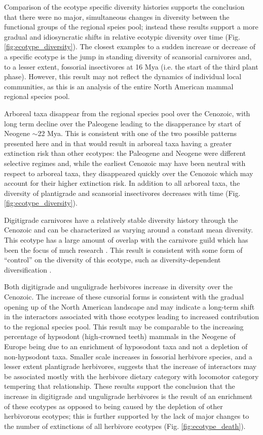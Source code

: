 \documentclass[12pt,letterpaper]{article}
\begin{document}
Comparison of the ecotype specific diversity histories supports the conclusion that there were no major, simultaneous changes in diversity between the functional groups of the regional speies pool; instead these results support a more gradual and idiosyncratic shifts in relative ecotypic diversity over time (Fig. \ref{fig:ecotype_diversity}). The closest examples to a sudden increase or decrease of a specific ecotype is the jump in standing diversity of scansorial carnivores and, to a lesser extent, fossorial insectivores at 16 Mya (i.e. the start of the third plant phase). However, this result may not reflect the dynamics of individual local communities, as this is an analysis of the entire North American mammal regional species pool.

Arboreal taxa disappear from the regional species pool over the Cenozoic, with long term decline over the Paleogene leading to the disapperance by start of Neogene \(\sim\)22 Mya. This is consistent with one of the two possible patterns presented here and in \citet{Smits2015b} that would result in arboreal taxa having a greater extinction risk than other ecotypes: the Paleogene and Neogene were different selective regimes and, while the earliest Cenozoic may have been neutral with respect to arboreal taxa, they disappeared quickly over the Cenozoic which may account for their higher extinction risk. In addition to all arboreal taxa, the diversity of plantigrade and scansorial insectivores decreases with time (Fig. \ref{fig:ecotype_diversity}).

Digitigrade carnivores have a relatively stable diversity history through the Cenozoic and can be characterized as varying around a constant mean diversity. This ecotype has a large amount of overlap with the carnivore guild which has been the focus of much research \citep{Slater2015c,Valkenburgh1999,Pires2015a,Janis1993c}. This result is consistent with some form of ``control'' on the diversity of this ecotype, such as diversity-dependent diversification \citep{Slater2015c,Silvestro2015b,Valkenburgh1999}.

Both digitigrade and unguligrade herbivores increase in diversity over the Cenozoic. The increase of these cursorial forms is consistent with the gradual opening up of the North American landscape \citep{Blois2009,Stromberg2005,Graham2011a} and may indicate a long-term shift in the interactors associated with those ecotypes leading to increased contribution to the regional species pool. This result may be comparable to the increasing percentage of hypsodont (high-crowned teeth) mammals in the Neogene of Europe being due to an enrichment of hyposodont taxa and not a depletion of non-hypsodont taxa. Smaller scale increases in fossorial herbivore species, and a lesser extent plantigrade herbivores, suggests that the increase of interactors may be associated mostly with the herbivore dietary category with locomotor category tempering that relationship. These results support the conclusion that the increase in digitigrade and unguligrade herbivores is the result of an enrichment of these ecotypes as opposed to being caused by the depletion of other herbivorous ecotypes; this is further supported by the lack of major changes to the number of extinctions of all herbivore ecotypes (Fig. \ref{fig:ecotype_death}).
\end{document}
